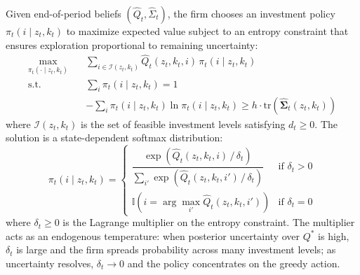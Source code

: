 \begin{proposition} \label{prop:optimal_policy}
    Given end-of-period beliefs $(\hat{Q}_t, \hat{\Sigma}_t)$, the firm 
    chooses an investment policy $\pi_t(i \mid z_t, k_t)$ to maximize 
    expected value subject to an entropy constraint that ensures exploration 
    proportional to remaining uncertainty:
    \begin{align}
        \max_{\pi_t(\cdot \mid z_t, k_t)} \quad 
        & \sum_{i \in \mathcal{I}(z_t, k_t)} 
        \hat{Q}_t(z_t, k_t, i)\, \pi_t(i \mid z_t, k_t) \\
        \text{s.t.} \quad 
        & \sum_i \pi_t(i \mid z_t, k_t) = 1 \\
        & -\sum_i \pi_t(i \mid z_t, k_t) 
        \ln \pi_t(i \mid z_t, k_t) \geq 
        h \cdot \mathrm{tr}\!\left(\hat{\boldsymbol{\Sigma}}_t(z_t, k_t)\right)
        \label{eq:entropy_constraint}
    \end{align}
    where $\mathcal{I}(z_t, k_t)$ is the set of feasible investment levels 
    satisfying $d_t \geq 0$. The solution is a state-dependent softmax 
    distribution:
    \begin{equation}
        \pi_t(i \mid z_t, k_t) = \begin{cases}
        \dfrac{\exp\!\left(\hat{Q}_t(z_t, k_t, i)\, /\, \delta_t\right)}
        {\displaystyle\sum_{i'} \exp\!\left(\hat{Q}_t(z_t, k_t, i')\, 
        /\, \delta_t\right)} 
        & \text{if } \delta_t > 0 \\[3ex]
        \mathbb{I}\!\left(i = \arg\max_{i'} 
        \hat{Q}_t(z_t, k_t, i')\right) 
        & \text{if } \delta_t = 0
        \end{cases}
    \end{equation}
    where $\delta_t \geq 0$ is the Lagrange multiplier on the entropy 
    constraint. The multiplier acts as an endogenous temperature: when 
    posterior uncertainty over $Q^*$ is high, $\delta_t$ is large and the 
    firm spreads probability across many investment levels; as uncertainty 
    resolves, $\delta_t \to 0$ and the policy concentrates on the greedy 
    action.
\end{proposition}